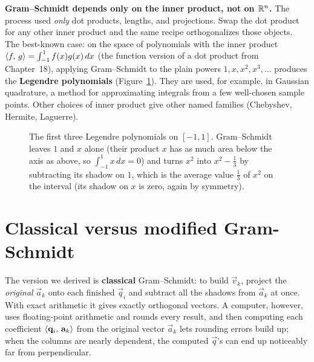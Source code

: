 \begin{connectionbox}
\textbf{Gram--Schmidt depends only on the inner product, not on $\mathbb{R}^n$.} The
process used \emph{only} dot products, lengths, and projections. Swap the dot product
for any other inner product and the same recipe orthogonalizes those objects. The
best-known case: on the space of polynomials with the inner product
$\langle f,\, g \rangle=\int_{-1}^{1} f(x)g(x)\,dx$ (the function version of a dot product from
Chapter~18), applying Gram--Schmidt to the plain powers
$1,x,x^2,x^3,\dots$ produces the \textbf{Legendre polynomials}
(Figure~\ref{ch20:legendre}). They are used, for example, in Gaussian quadrature, a
method for approximating integrals from a few well-chosen sample points. Other choices of
inner product give other named families (Chebyshev, Hermite, Laguerre).
\end{connectionbox}

\begin{figure}[htbp]
\centering
{}
\caption{The first three Legendre polynomials on $[-1,1]$. Gram--Schmidt leaves $1$ and $x$
alone (their product $x$ has as much area below the axis as above, so $\int_{-1}^1 x\,dx=0$)
and turns $x^2$ into $x^2-\tfrac13$ by subtracting its shadow on $1$, which is the
average value $\tfrac13$ of $x^2$ on the interval (its shadow on $x$ is zero, again by symmetry).}
\label{ch20:legendre}
\end{figure}

\section{Classical versus modified Gram-Schmidt}

The version we derived is \textbf{classical} Gram--Schmidt: to build $\vec{v}_k$,
project the \emph{original} $\vec{a}_k$ onto each finished $\vec{q}_i$ and subtract all
the shadows from $\vec{a}_k$ at once. With exact arithmetic it gives exactly orthogonal
vectors. A computer, however, uses floating-point arithmetic and rounds every result, and
then computing each coefficient $\langle \mathbf{q}_i,\, \mathbf{a}_k \rangle$ from the original
vector $\vec{a}_k$ lets rounding errors build up; when the columns are nearly
dependent, the computed $\vec{q}$'s can end up noticeably far from perpendicular.

